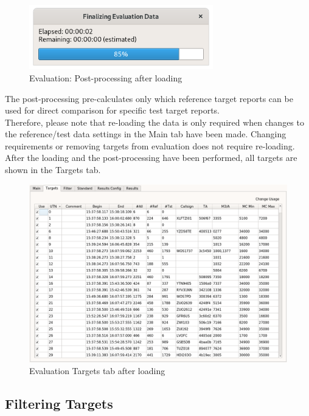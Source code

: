\begin{figure}[H]
  \centering 
    \includegraphics[width=8cm]{figures/eval_post.png}
  \caption{Evaluation: Post-processing after loading}
\end{figure}

The post-processing pre-calculates only which reference target reports can be used for direct comparison for specific test target reports. \\

Therefore, please note that re-loading the data is only required when changes to the reference/test data settings in the Main tab have been made. Changing requirements or removing targets from evaluation does not require re-loading. \\

After the loading and the post-processing have been performed, all targets are shown in the Targets tab.

\begin{figure}[H]
  \hspace*{-2cm}
    \includegraphics[width=18cm,frame]{figures/eval_targets_loaded.png}
  \caption{Evaluation Targets tab after loading}
\end{figure}

\subsection{Filtering Targets}
\label{sec:eval_filter_targets} 

